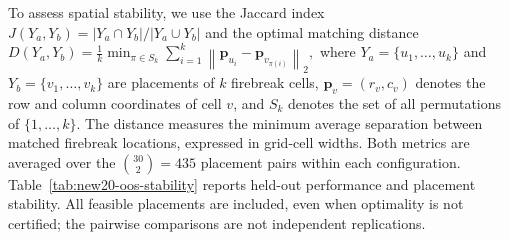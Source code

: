 \documentclass{itor}
\begin{document}
To assess spatial stability, we use the Jaccard index
$J(Y_a,Y_b)=|Y_a\cap Y_b|/|Y_a\cup Y_b|$ and the optimal
matching distance $D(Y_a,Y_b)=\frac{1}{k}\min_{\pi\in S_k}
\sum_{i=1}^{k} \left\|\mathbf{p}_{u_i}-\mathbf{p}_{v_{\pi(i)}}\right\|_2,$ where $Y_a=\{u_1,\ldots,u_k\}$ and $Y_b=\{v_1,\ldots,v_k\}$
are placements of $k$ firebreak cells,
$\mathbf{p}_v=(r_v,c_v)$ denotes the row and column coordinates
of cell $v$, and $S_k$ denotes the set of all permutations
of $\{1,\ldots,k\}$. The distance measures the minimum
average separation between matched firebreak locations,
expressed in grid-cell widths. Both metrics are averaged over the
$\binom{30}{2}=435$ placement pairs within each configuration.
Table~\ref{tab:new20-oos-stability} reports held-out performance
and placement stability. All feasible placements are included,
even when optimality is not certified; the pairwise comparisons
are not independent replications.
\end{document}
